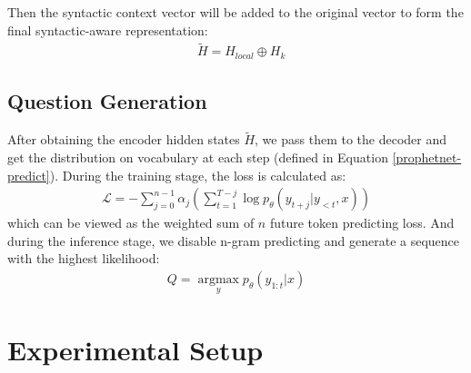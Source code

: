 \documentclass[11pt]{article}
\begin{document}
Then the syntactic context vector will be added to the original vector to form the final syntactic-aware representation:
\begin{align}
    & \tilde{H} = H_{local} \oplus H_k
\end{align}


\subsection{Question Generation}
After obtaining the encoder hidden states $\tilde{H}$, we pass them to the decoder and get the distribution on vocabulary at each step (defined in Equation \ref{prophetnet-predict}). During the training stage, the loss is calculated as:
\begin{align}
    \mathcal{L} = -\sum_{j=0}^{n-1} \alpha_j \left( \sum_{t=1}^{T-j} \log p_\theta (y_{t+j}|y_{<t}, x)\right)
\end{align}
which can be viewed as the weighted sum of $n$ future token predicting loss. And during the inference stage, we disable n-gram predicting and generate a sequence with the highest likelihood:
\begin{align}
    Q = \operatorname*{argmax}_y p_\theta(y_{1:t}|x)
\end{align}


\section{Experimental Setup}
\end{document}
